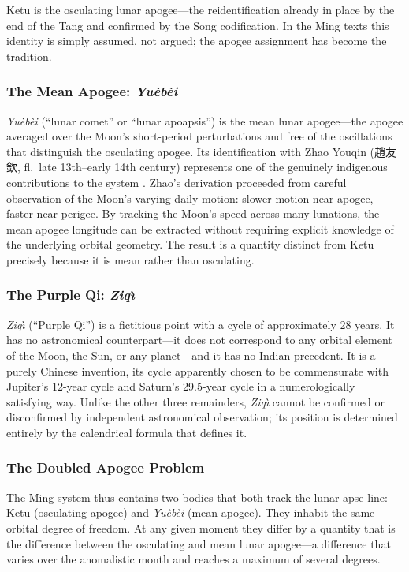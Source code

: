 \documentclass[10pt,a4paper]{article}
\newcommand{\zh}[1]{#1}
\begin{document}
Ketu is the osculating lunar apogee---the
reidentification already in place by the end of the Tang and
confirmed by the Song codification.  In the Ming texts this identity
is simply assumed, not argued; the apogee assignment has become the
tradition.

\subsubsection*{The Mean Apogee: \textit{Yu\`eb\`ei}}

\textit{Yu\`eb\`ei} (``lunar comet'' or ``lunar
apoapsis'') is the mean lunar apogee---the apogee averaged over the
Moon's short-period perturbations and free of the oscillations that
distinguish the osculating apogee.  Its identification with Zhao
Youqin (\zh{趙友欽}, fl.\ late 13th--early 14th century) represents
one of the genuinely indigenous contributions to the system
\cite{niu2010fourremains}.  Zhao's derivation proceeded from careful
observation of the Moon's varying daily motion: slower motion near
apogee, faster near perigee.  By tracking the Moon's speed across
many lunations, the mean apogee longitude can be extracted without
requiring explicit knowledge of the underlying orbital geometry.
The result is a quantity distinct from Ketu precisely because
it is mean rather than osculating.

\subsubsection*{The Purple Qi: \textit{Ziq\`{\i}}}

\textit{Ziq\`{\i}} (``Purple Qi'') is a fictitious
point with a cycle of approximately 28 years.  It has no
astronomical counterpart---it does not correspond to any orbital
element of the Moon, the Sun, or any planet---and it has no Indian
precedent.  It is a purely Chinese invention, its cycle apparently
chosen to be commensurate with Jupiter's 12-year cycle and Saturn's
29.5-year cycle in a numerologically satisfying way.  Unlike the
other three remainders, \textit{Ziq\`{\i}} cannot be confirmed or disconfirmed
by independent astronomical observation; its position is determined
entirely by the calendrical formula that defines it.

\subsubsection*{The Doubled Apogee Problem}

The Ming system thus contains two bodies that both track the lunar
apse line: Ketu (osculating apogee) and \textit{Yu\`eb\`ei} (mean
apogee).  They inhabit the same orbital degree of freedom.  At any
given moment they differ by a quantity that is the difference between
the osculating and mean lunar apogee---a difference that varies over
the anomalistic month and reaches a maximum of several degrees.
\end{document}
